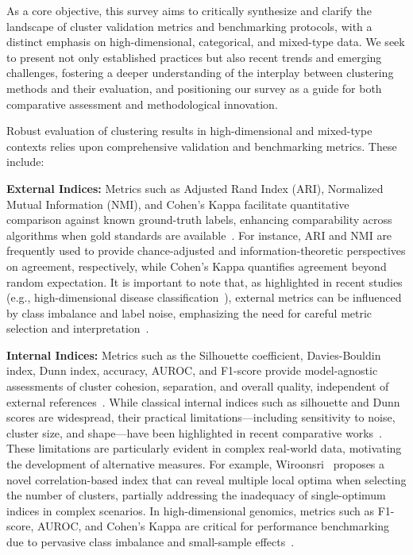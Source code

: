 \documentclass[sigconf]{acmart}
\begin{document}
As a core objective, this survey aims to critically synthesize and clarify the landscape of cluster validation metrics and benchmarking protocols, with a distinct emphasis on high-dimensional, categorical, and mixed-type data. We seek to present not only established practices but also recent trends and emerging challenges, fostering a deeper understanding of the interplay between clustering methods and their evaluation, and positioning our survey as a guide for both comparative assessment and methodological innovation.

Robust evaluation of clustering results in high-dimensional and mixed-type contexts relies upon comprehensive validation and benchmarking metrics. These include:

\textbf{External Indices:} Metrics such as Adjusted Rand Index (ARI), Normalized Mutual Information (NMI), and Cohen’s Kappa facilitate quantitative comparison against known ground-truth labels, enhancing comparability across algorithms when gold standards are available~\cite{ref14,ref17,ref19,ref20,ref21,ref22,ref33,ref44,ref45,ref46,ref67,ref71,ref72,ref74,ref75,ref77,ref78,ref90,ref92,ref93,ref94,ref95,ref96,ref97,ref113}. For instance, ARI and NMI are frequently used to provide chance-adjusted and information-theoretic perspectives on agreement, respectively, while Cohen's Kappa quantifies agreement beyond random expectation. It is important to note that, as highlighted in recent studies (e.g., high-dimensional disease classification~\cite{ref71,ref72,ref74}), external metrics can be influenced by class imbalance and label noise, emphasizing the need for careful metric selection and interpretation~\cite{ref14,ref71,ref74}.

\textbf{Internal Indices:} Metrics such as the Silhouette coefficient, Davies-Bouldin index, Dunn index, accuracy, AUROC, and F1-score provide model-agnostic assessments of cluster cohesion, separation, and overall quality, independent of external references~\cite{ref14,ref16,ref17,ref19,ref21,ref33,ref44,ref46,ref50,ref59,ref60,ref67,ref71,ref72,ref75,ref77,ref78,ref90,ref92,ref93,ref94,ref95,ref96,ref97,ref100,ref113}. While classical internal indices such as silhouette and Dunn scores are widespread, their practical limitations---including sensitivity to noise, cluster size, and shape---have been highlighted in recent comparative works~\cite{ref59,ref67}. These limitations are particularly evident in complex real-world data, motivating the development of alternative measures. For example, Wiroonsri~\cite{ref60} proposes a novel correlation-based index that can reveal multiple local optima when selecting the number of clusters, partially addressing the inadequacy of single-optimum indices in complex scenarios. In high-dimensional genomics, metrics such as F1-score, AUROC, and Cohen’s Kappa are critical for performance benchmarking due to pervasive class imbalance and small-sample effects~\cite{ref71,ref72,ref74,ref95,ref96}.
\end{document}
